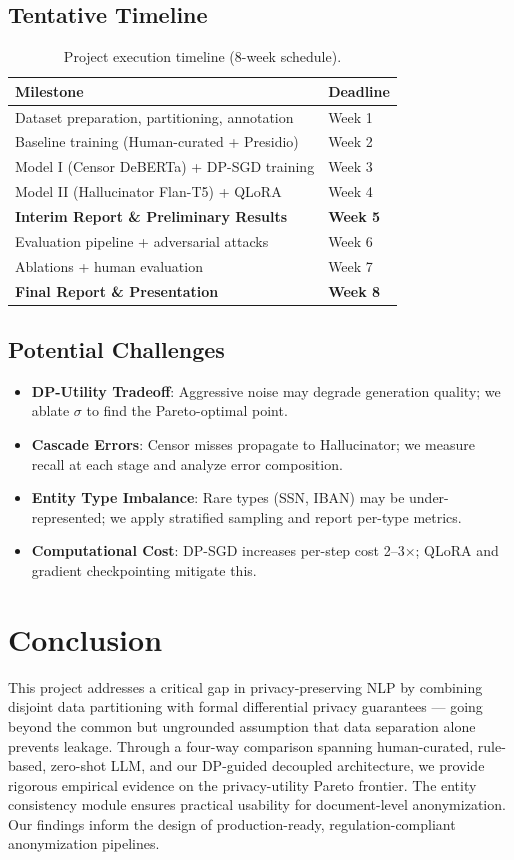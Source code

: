 \documentclass[9pt]{article}
\begin{document}
\subsection{Tentative Timeline}
\begin{table}[ht]
\centering
\small
\begin{tabular}{@{}ll@{}}
\toprule
\textbf{Milestone} & \textbf{Deadline} \\
\midrule
Dataset preparation, partitioning, annotation & Week 1 \\
Baseline training (Human-curated + Presidio) & Week 2 \\
Model I (Censor DeBERTa) + DP-SGD training & Week 3 \\
Model II (Hallucinator Flan-T5) + QLoRA & Week 4 \\
\textbf{Interim Report \& Preliminary Results} & \textbf{Week 5} \\
Evaluation pipeline + adversarial attacks & Week 6 \\
Ablations + human evaluation & Week 7 \\
\textbf{Final Report \& Presentation} & \textbf{Week 8} \\
\bottomrule
\end{tabular}
\caption{Project execution timeline (8-week schedule).}
\label{tab:timeline}
\end{table}

\subsection{Potential Challenges}
\begin{itemize}
    \item \textbf{DP-Utility Tradeoff}: Aggressive noise may degrade generation quality; we ablate $\sigma$ to find the Pareto-optimal point.
    \item \textbf{Cascade Errors}: Censor misses propagate to Hallucinator; we measure recall at each stage and analyze error composition.
    \item \textbf{Entity Type Imbalance}: Rare types (SSN, IBAN) may be under-represented; we apply stratified sampling and report per-type metrics.
    \item \textbf{Computational Cost}: DP-SGD increases per-step cost 2--3$\times$; QLoRA and gradient checkpointing mitigate this.
\end{itemize}

\section{Conclusion}
This project addresses a critical gap in privacy-preserving NLP by combining disjoint data partitioning with formal differential privacy guarantees --- going beyond the common but ungrounded assumption that data separation alone prevents leakage. Through a four-way comparison spanning human-curated, rule-based, zero-shot LLM, and our DP-guided decoupled architecture, we provide rigorous empirical evidence on the privacy-utility Pareto frontier. The entity consistency module ensures practical usability for document-level anonymization. Our findings inform the design of production-ready, regulation-compliant anonymization pipelines.



\end{document}
